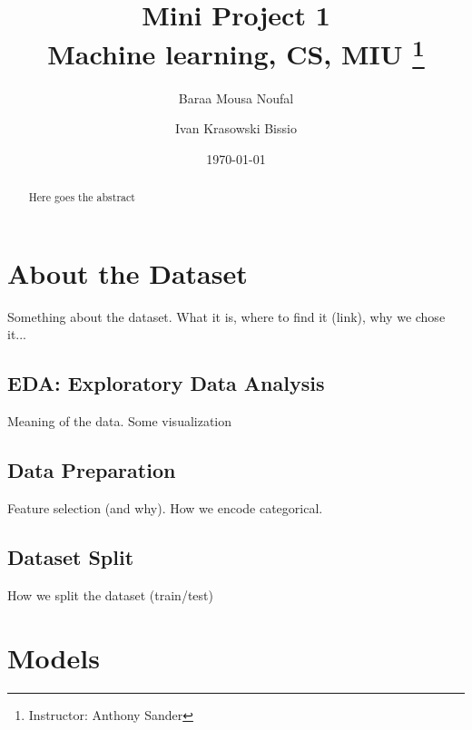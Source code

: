 


\title{
	Mini Project 1 \\
	Machine learning, CS, MIU \thanks{Instructor: Anthony Sander}
}

\author{Baraa Mousa Noufal \and Ivan Krasowski Bissio}
\date{\today}


\maketitle
\tableofcontents

\begin{abstract}

    Here goes the abstract

\end{abstract}

\section{About the Dataset}
Something about the dataset. What it is, where to find it (link), why we chose it...

\subsection{EDA: Exploratory Data Analysis}
Meaning of the data. Some visualization

\subsection{Data Preparation}
Feature selection (and why). How we encode categorical.

\subsection{Dataset Split}
How we split the dataset (train/test)

\section{Models}


